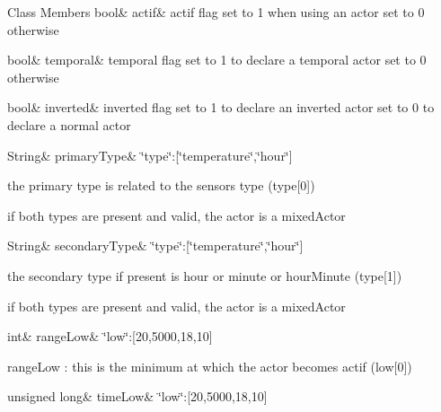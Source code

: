 \begin{DoxyFields}{Class Members}
\mbox{\label{class_jetpack_aa177541689bbaea21a4650a083b0df77}} 
bool&
actif&
actif flag set to 1 when using an actor set to 0 otherwise \\
\hline

\mbox{\label{class_jetpack_abd6039e7a48856550b0ffbf8bcff7bdd}} 
bool&
temporal&
temporal flag set to 1 to declare a temporal actor set to 0 otherwise \\
\hline

\mbox{\label{class_jetpack_a6bc03bb8f05b10aa142dbb0c39c87fb5}} 
bool&
inverted&
inverted flag set to 1 to declare an inverted actor set to 0 to declare a normal actor \\
\hline

\mbox{\label{class_jetpack_aa6242c32eb0ab42aaea170636ab949e1}} 
String&
primaryType&
\char`\"{}type\char`\"{}\+:\mbox{[}\char`\"{}temperature\char`\"{},\char`\"{}hour\char`\"{}\mbox{]}

the primary type is related to the sensor\textquotesingle{}s type (type\mbox{[}0\mbox{]})

if both types are present and valid, the actor is a mixed\+Actor \\
\hline

\mbox{\label{class_jetpack_a81cf9af139da095b7d91e2a87e50135b}} 
String&
secondaryType&
\char`\"{}type\char`\"{}\+:\mbox{[}\char`\"{}temperature\char`\"{},\char`\"{}hour\char`\"{}\mbox{]}

the secondary type if present is hour or minute or hour\+Minute (type\mbox{[}1\mbox{]})

if both types are present and valid, the actor is a mixed\+Actor \\
\hline

\mbox{\label{class_jetpack_ad0343b4fd5740c9c1b0876b27f84ace5}} 
int&
rangeLow&
\char`\"{}low\char`\"{}\+:\mbox{[}20,5000,18,10\mbox{]}

range\+Low \+: this is the minimum at which the actor becomes actif (low\mbox{[}0\mbox{]}) \\
\hline

\mbox{\label{class_jetpack_ae544475d627308218e355a8dbb28ac74}} 
unsigned long&
timeLow&
\char`\"{}low\char`\"{}\+:\mbox{[}20,5000,18,10\mbox{]}


\end{DoxyFields}
